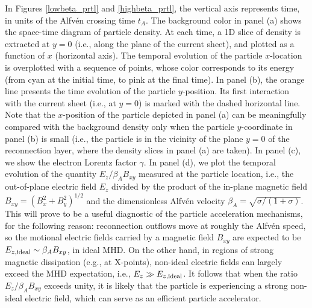 In Figures \ref{lowbeta_prtl} and \ref{highbeta_prtl}, the vertical axis represents time, in units of the Alfv\'en crossing time $t_A$. The background color in panel (a) shows the space-time diagram of  particle density. At each time, a 1D slice of density is extracted at $y=0$ (i.e., along the plane of the current sheet), and plotted as a function of $x$ (horizontal axis). The temporal evolution of the particle $x$-location is overplotted with a sequence of points, whose color corresponds to its energy (from cyan at the initial time, to pink at the final time). In panel (b), the orange line presents the time evolution of the particle $y$-position. Its first interaction with the current sheet (i.e., at $y=0$) is marked with the dashed horizontal line. Note that the $x$-position of the particle depicted in panel (a) can be meaningfully compared with the background density only when the particle $y$-coordinate in panel (b) is small (i.e., the particle is in the vicinity of the plane $y=0$ of the reconnection layer, where the density slices in panel (a) are taken).
In panel (c), we show the electron Lorentz factor $\gamma$. 
 In panel (d), we plot the temporal evolution of the quantity $E_{z}/\beta_{A}B_{xy}$ measured at the particle location, i.e., the out-of-plane electric field $E_z$ divided by the product of the in-plane magnetic field $B_{xy}=(B_{x}^{2}+B_{y}^{2})^{1/2}$ and the dimensionless Alfv\'en velocity $\beta_A=\sqrt{\sigma/(1+\sigma)}$. This will prove to be a useful diagnostic of the particle acceleration mechanisms, for the following reason: reconnection outflows move at roughly the Alfv\'en speed, so the motional electric fields carried by a magnetic field $B_{xy}$ are expected to be $E_{z,\rm ideal}\sim \beta_{A}B_{xy}$, in ideal MHD. On the other hand, in regions of strong magnetic dissipation  (e.g., at  X-points), non-ideal electric fields can largely exceed the MHD expectation, i.e., $E_z\gg E_{z,\rm ideal}$. It follows that when the ratio $E_{z}/\beta_{A}B_{xy}$ exceeds unity, it is likely that the particle is experiencing a strong non-ideal electric field, which can serve as an efficient particle accelerator.
   

